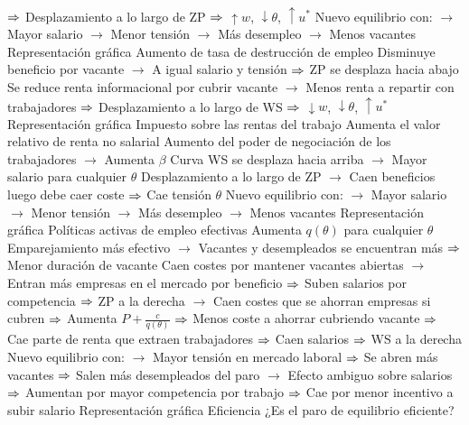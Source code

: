 \documentclass{nuevotema}
\begin{document}
\begin{esquemal}
				\4[] $\Rightarrow$ Desplazamiento a lo largo de ZP
				\4[] $\Rightarrow$ $\uparrow w$, $\downarrow \theta$, $\uparrow u^*$
				\4[] Nuevo equilibrio con:
				\4[] $\to$ Mayor salario
				\4[] $\to$ Menor tensión
				\4[] $\to$ Más desempleo
				\4[] $\to$ Menos vacantes
				\4[] Representación gráfica
				\4[] 
				\4 Aumento de tasa de destrucción de empleo
				\4[] Disminuye beneficio por vacante
				\4[] $\to$ A igual salario y tensión
				\4[] $\Rightarrow$ ZP se desplaza hacia abajo
				\4[] Se reduce renta informacional por cubrir vacante
				\4[] $\to$ Menos renta a repartir con trabajadores
				\4[] $\Rightarrow$ Desplazamiento a lo largo de WS
				\4[] $\Rightarrow$ $\downarrow w$, $\downarrow \theta$, $\uparrow u^*$
				\4[] Representación gráfica
				\4[] 
				\4 Impuesto sobre las rentas del trabajo
				\4[] Aumenta el valor relativo de renta no salarial
				\4[] Aumento del poder de negociación de los trabajadores
				\4[] $\to$ Aumenta $\beta$
				\4[] Curva WS se desplaza hacia arriba
				\4[] $\to$ Mayor salario para cualquier $\theta$
				\4[] Desplazamiento a lo largo de ZP
				\4[] $\to$ Caen beneficios luego debe caer coste
				\4[] $\Rightarrow$ Cae tensión $\theta$
				\4[] Nuevo equilibrio con:
				\4[] $\to$ Mayor salario
				\4[] $\to$ Menor tensión
				\4[] $\to$ Más desempleo
				\4[] $\to$ Menos vacantes
				\4[] Representación gráfica
				\4[] 
				\4 Políticas activas de empleo efectivas
				\4[] Aumenta $q(\theta)$ para cualquier $\theta$
				\4[] Emparejamiento más efectivo
				\4[] $\to$ Vacantes y desempleados se encuentran más
				\4[] $\Rightarrow$ Menor duración de vacante
				\4[] Caen costes por mantener vacantes abiertas
				\4[] $\to$ Entran más empresas en el mercado por beneficio
				\4[] $\Rightarrow$ Suben salarios por competencia
				\4[] $\Rightarrow$ ZP a la derecha
				\4[] $\to$ Caen costes que se ahorran empresas si cubren
				\4[] $\Rightarrow$ Aumenta $P+\frac{c}{q(\theta)}$
				\4[] $\Rightarrow$ Menos coste a ahorrar cubriendo vacante
				\4[] $\Rightarrow$ Cae parte de renta que extraen trabajadores
				\4[] $\Rightarrow$ Caen salarios
				\4[] $\Rightarrow$ WS a la derecha
				\4[] Nuevo equilibrio con:
				\4[] $\to$ Mayor tensión en mercado laboral
				\4[] $\Rightarrow$ Se abren más vacantes
				\4[] $\Rightarrow$ Salen más desempleados del paro
				\4[] $\to$ Efecto ambiguo sobre salarios
				\4[] $\Rightarrow$ Aumentan por mayor competencia por trabajo
				\4[] $\Rightarrow$ Cae por menor incentivo a subir salario
				\4[] Representación gráfica
				\4[] 
				\4 Eficiencia
				\4[] ¿Es el paro de equilibrio eficiente?

\end{esquemal}
\end{document}
